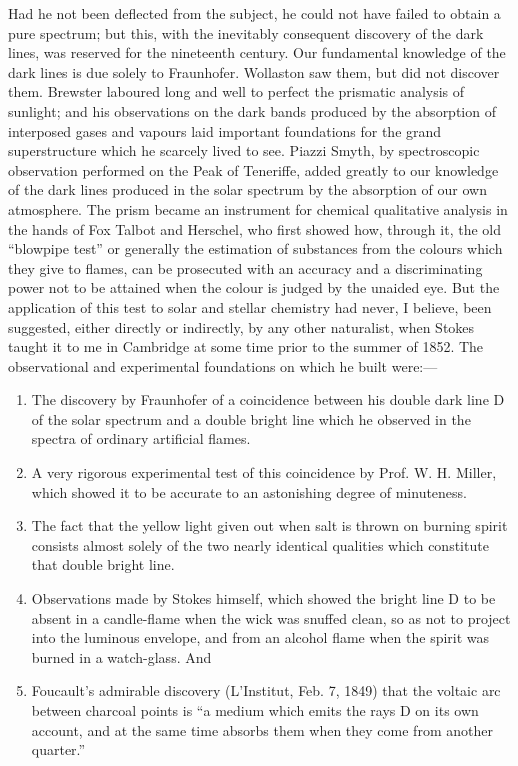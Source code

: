 \documentclass[a4paper, 11pt, oneside, english]{article}
\begin{document}
Had he not been deflected from the subject, he could not have failed to obtain a pure spectrum; but this, with the inevitably consequent discovery of the dark lines, was reserved for the nineteenth century. Our fundamental knowledge of the dark lines is due solely to Fraunhofer. Wollaston saw them, but did not discover them. Brewster laboured long and well to perfect the prismatic analysis of sunlight; and his observations on the dark bands produced by the absorption of interposed gases and vapours laid important foundations for the grand superstructure which he scarcely lived to see. Piazzi Smyth, by spectroscopic observation performed on the Peak of Teneriffe, added greatly to our knowledge of the dark lines produced in the solar spectrum by the absorption of our own atmosphere. The prism became an instrument for chemical qualitative analysis in the hands of Fox Talbot and Herschel, who first showed how, through it, the old ``blowpipe test'' or generally the estimation of substances from the colours which they give to flames, can be prosecuted with an accuracy and a discriminating power not to be attained when the colour is judged by the unaided eye. But the application of this test to solar and stellar chemistry had never, I believe, been suggested, either directly or indirectly, by any other naturalist, when Stokes taught it to me in Cambridge at some time prior to the summer of 1852. The observational and experimental foundations on which he built were:---
\begin{enumerate}
    \item The discovery by Fraunhofer of a coincidence between his double dark line D of the solar spectrum and a double bright line which he observed in the spectra of ordinary artificial flames.
    \item A very rigorous experimental test of this coincidence by Prof. W. H. Miller, which showed it to be accurate to an astonishing degree of minuteness.
    \item The fact that the yellow light given out when salt is thrown on burning spirit consists almost solely of the two nearly identical qualities which constitute that double bright line.
    \item Observations made by Stokes himself, which showed the bright line D to be absent in a candle-flame when the wick was snuffed clean, so as not to project into the luminous envelope, and from an alcohol flame when the spirit was burned in a watch-glass. And
    \item Foucault's admirable discovery (L'Institut, Feb. 7, 1849) that the voltaic arc between charcoal points is ``a medium which emits the rays D on its own account, and at the same time absorbs them when they come from another quarter.''
\end{enumerate}
\end{document}
